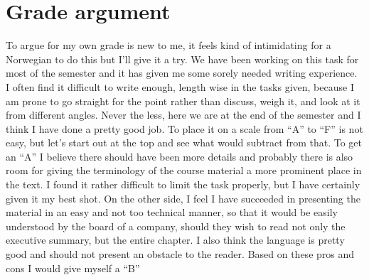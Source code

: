 \section{Grade argument}
To argue for my own grade is new to me, it feels kind of intimidating for a Norwegian to do this but I’ll give it a try.
We have been working on this task for most of the semester and it has given me some sorely needed writing experience. I often find it difficult to write enough, length wise in the tasks given, because I am prone to go straight for the point rather than discuss, weigh it, and look at it from different angles.
Never the less, here we are at the end of the semester and I think I have done a pretty good job. To place it on a scale from “A” to “F” is not easy, but let’s start out at the top and see what would subtract from that.
To get an “A” I believe there should have been more details and probably there is also room for giving the terminology of the course material a more prominent place in the text. I found it rather difficult to limit the task properly, but I have certainly given it my best shot. 
On the other side, I feel I have succeeded in presenting the material in an easy and not too technical manner, so that it would be easily understood by the board of a company, should they wish to read not only the executive summary, but the entire chapter. I also think the language is pretty good and should not present an obstacle to the reader.
Based on these pros and cons I would give myself a “B”
